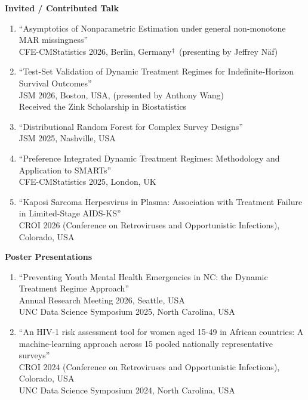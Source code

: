 \documentclass[11pt]{scrartcl}
\begin{document}
\textbf{Invited / Contributed Talk}
\begin{enumerate}
  \item ``Asymptotics of Nonparametric Estimation under general non-monotone MAR missingness''\\
  CFE-CMStatistics 2026, Berlin, Germany$^\textsubscript{†}$ (presenting by Jeffrey N\"af)
  
  \item ``Test-Set Validation of Dynamic Treatment Regimes for Indefinite-Horizon Survival Outcomes''\\
  JSM 2026, Boston, USA, (presented by Anthony Wang)\\
  Received the Zink Scholarship in Biostatistics
  
  \item ``Distributional Random Forest for Complex Survey Designs'' \\
  JSM 2025, Nashville, USA
  
  \item ``Preference Integrated Dynamic Treatment Regimes: Methodology and Application to SMARTs''\\
  CFE-CMStatistics 2025, London, UK

  \item ``Kaposi Sarcoma Herpesvirus in Plasma: Association with Treatment Failure in Limited-Stage AIDS-KS''\\
  CROI 2026 (Conference on Retroviruses and Opportunistic Infections), Colorado, USA
\end{enumerate}


\textbf{Poster Presentations}
\begin{enumerate}
  \item ``Preventing Youth Mental Health Emergencies in NC: the Dynamic Treatment Regime Approach''\\
  Annual Research Meeting 2026, Seattle, USA\\
  UNC Data Science Symposium 2025, North Carolina, USA

  \item ``An HIV-1 risk assessment tool for women aged 15-49 in African countries: A machine-learning approach across 15 pooled nationally representative surveys''\\
  CROI 2024 (Conference on Retroviruses and Opportunistic Infections), Colorado, USA\\
  UNC Data Science Symposium 2024, North Carolina, USA

\end{enumerate}
\end{document}
